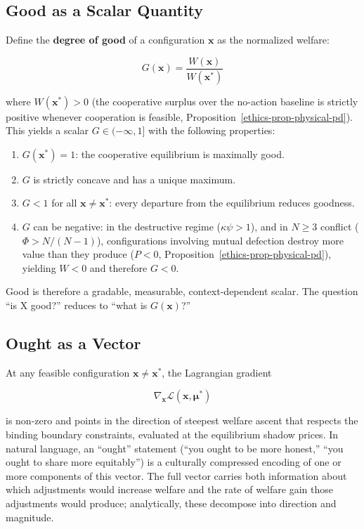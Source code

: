 \documentclass[11pt]{article}
\theoremstyle{plain}
\theoremstyle{definition}
\theoremstyle{remark}
\let\origsubsection\subsection
\renewcommand{\subsection}{\needspace{7\baselineskip}\origsubsection}
\providecommand{\tightlist}{%
  \setlength{\itemsep}{0pt}\setlength{\parskip}{0pt}}
\begin{document}
\subsection{Good as a Scalar Quantity}\label{good-as-a-scalar-quantity}

Define the \textbf{degree of good} of a configuration \(\mathbf{x}\) as
the normalized welfare:

\[G(\mathbf{x}) = \frac{W(\mathbf{x})}{W(\mathbf{x}^*)}\]

where \(W(\mathbf{x}^*) > 0\) (the cooperative surplus over the
no-action baseline is strictly positive whenever cooperation is
feasible, Proposition~\ref{ethics-prop-physical-pd}). This yields a
scalar \(G \in (-\infty, 1]\) with the following properties:

\begin{enumerate}
\def\labelenumi{\arabic{enumi}.}
\tightlist
\item
  \(G(\mathbf{x}^*) = 1\): the cooperative equilibrium is maximally
  good.
\item
  \(G\) is strictly concave and has a unique maximum.
\item
  \(G < 1\) for all \(\mathbf{x} \neq \mathbf{x}^*\): every departure
  from the equilibrium reduces goodness.
\item
  \(G\) can be negative: in the destructive regime (\(\kappa\psi > 1\)),
  and in \(N \geq 3\) conflict (\(\Phi > N/(N-1)\)), configurations
  involving mutual defection destroy more value than they produce
  (\(P < 0\), Proposition~\ref{ethics-prop-physical-pd}), yielding
  \(W < 0\) and therefore \(G < 0\).
\end{enumerate}

Good is therefore a gradable, measurable, context-dependent scalar. The
question ``is X good?'' reduces to ``what is \(G(\mathbf{x})\)?''

\subsection{Ought as a Vector}\label{ought-as-a-vector}

At any feasible configuration \(\mathbf{x} \neq \mathbf{x}^*\), the
Lagrangian gradient

\[\nabla_{\mathbf{x}} \mathcal{L}(\mathbf{x}, \boldsymbol{\mu}^*)\]

is non-zero and points in the direction of steepest welfare ascent that
respects the binding boundary constraints, evaluated at the equilibrium
shadow prices. In natural language, an ``ought'' statement (``you ought
to be more honest,'' ``you ought to share more equitably'') is a
culturally compressed encoding of one or more components of this vector.
The full vector carries both information about which adjustments would
increase welfare and the rate of welfare gain those adjustments would
produce; analytically, these decompose into direction and magnitude.
\end{document}
